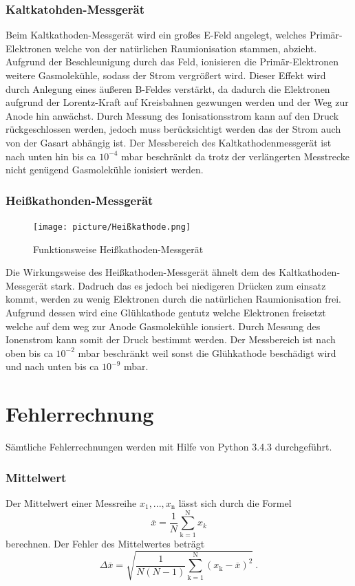\subsubsection{Kaltkatohden-Messgerät}
Beim Kaltkathoden-Messgerät wird ein großes E-Feld angelegt, welches Primär-Elektronen welche von der natürlichen Raumionisation stammen, abzieht. Aufgrund der Beschleunigung durch das Feld, ionisieren die Primär-Elektronen weitere Gasmolekühle, sodass der Strom vergrößert wird. Dieser Effekt wird durch Anlegung eines äußeren B-Feldes verstärkt, da dadurch die Elektronen aufgrund der Lorentz-Kraft auf Kreisbahnen gezwungen werden und der Weg zur Anode hin anwächst. Durch Messung des Ionisationsstrom kann auf den Druck rückgeschlossen werden, jedoch muss berücksichtigt werden das der Strom auch von der Gasart abhängig ist. Der Messbereich des Kaltkathodenmessgerät ist nach unten hin bis ca $10^{-4}$ mbar beschränkt da trotz der verlängerten Messtrecke nicht genügend Gasmolekühle ionisiert werden.

\subsubsection{Heißkathonden-Messgerät}
\begin{figure}
  \vspace{-1.0cm}
  \centering
  \texttt{[image: picture/Heißkathode.png]}
  \caption{Funktionsweise Heißkathoden-Messgerät \cite{Heiss}}
  \label{fig:Heißkathode}
  \vspace{-1cm}
\end{figure}
Die Wirkungsweise des Heißkathoden-Messgerät ähnelt dem des Kaltkathoden-Messgerät stark. Dadruch das es jedoch bei niedigeren Drücken zum einsatz kommt, werden zu wenig Elektronen durch die natürlichen Raumionisation frei. Aufgrund dessen wird eine Glühkathode gentutz welche Elektronen freisetzt welche auf dem weg zur Anode Gasmolekühle ionsiert. Durch Messung des Ionenstrom kann somit der Druck bestimmt werden. Der Messbereich ist nach oben bis ca $10^{-2}$ mbar beschränkt weil sonst die Glühkathode beschädigt wird und nach unten bis ca $10^{-9}$ mbar.  
\section{Fehlerrechnung}
Sämtliche Fehlerrechnungen werden mit Hilfe von Python 3.4.3 durchgeführt.
\subsubsection{Mittelwert}
Der Mittelwert einer Messreihe $x_\text{1}, ... ,x_\text{n}$ lässt sich durch die Formel
\begin{equation}
	\overline{x} = \frac{1}{N} \sum_{\text{k}=1}^\text{N} x_k
	\label{eqn:ave}
\end{equation}
berechnen. Der Fehler des Mittelwertes beträgt
\begin{equation}
	\Delta \overline{x} = \sqrt{ \frac{1}{N(N-1)} \sum_{\text{k}=1}^\text{N} (x_\text{k} - \overline{x})^2} \ .
	\label{eqn:std}
\end{equation}

